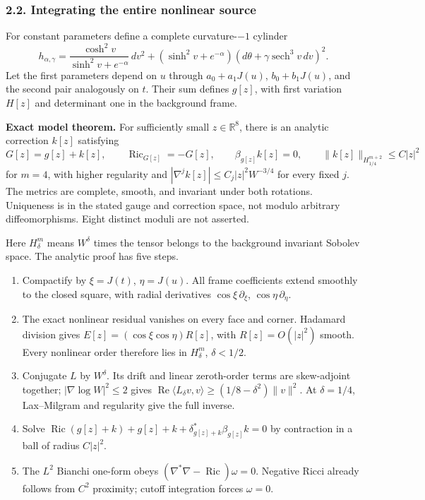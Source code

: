 \documentclass[
  english,
]{article}
\providecommand{\tightlist}{%
  \setlength{\itemsep}{0pt}\setlength{\parskip}{0pt}}
\begin{document}
\hypertarget{integrating-the-entire-nonlinear-source}{%
\subsubsection{2.2. Integrating the entire nonlinear
source}\label{integrating-the-entire-nonlinear-source}}

For constant parameters define a complete curvature-\(-1\) cylinder \[
h_{\alpha,\gamma}
=\frac{\cosh^2v}{\sinh^2v+e^{-\alpha}}\,dv^2
+(\sinh^2v+e^{-\alpha})(d\theta+\gamma\operatorname{sech}^3v\,dv)^2.
\] Let the first parameters depend on \(u\) through \(a_0+a_1J(u)\),
\(b_0+b_1J(u)\), and the second pair analogously on \(t\). Their sum
defines \(g[z]\), with first variation \(H[z]\) and determinant one in
the background frame.

\textbf{Exact model theorem.} For sufficiently small
\(z\in\mathbb R^8\), there is an analytic correction \(k[z]\) satisfying
\[
G[z]=g[z]+k[z],\qquad \operatorname{Ric}_{G[z]}=-G[z],\qquad
\beta_{g[z]}k[z]=0,\qquad
\|k[z]\|_{H^{m+2}_{1/4}}\le C|z|^2
\tag{2.3}
\] for \(m=4\), with higher regularity and
\(|\nabla^jk[z]|\le C_j|z|^2W^{-3/4}\) for every fixed \(j\). The
metrics are complete, smooth, and invariant under both rotations.
Uniqueness is in the stated gauge and correction space, not modulo
arbitrary diffeomorphisms. Eight distinct moduli are not asserted.

Here \(H^m_\delta\) means \(W^\delta\) times the tensor belongs to the
background invariant Sobolev space. The analytic proof has five steps.

\begin{enumerate}
\def\labelenumi{\arabic{enumi}.}
\tightlist
\item
  Compactify by \(\xi=J(t)\), \(\eta=J(u)\). All frame coefficients
  extend smoothly to the closed square, with radial derivatives
  \(\cos\xi\,\partial_\xi\), \(\cos\eta\,\partial_\eta\).
\item
  The exact nonlinear residual vanishes on every face and corner.
  Hadamard division gives \(E[z]=(\cos\xi\cos\eta)R[z]\), with
  \(R[z]=O(|z|^2)\) smooth. Every nonlinear order therefore lies in
  \(H^m_\delta\), \(\delta<1/2\).
\item
  Conjugate \(L\) by \(W^\delta\). Its drift and linear zeroth-order
  terms are skew-adjoint together; \(|\nabla\log W|^2\le2\) gives
  \(\operatorname{Re}\langle L_\delta v,v\rangle \ge(1/8-\delta^2)\|v\|^2\).
  At \(\delta=1/4\), Lax--Milgram and regularity give the full inverse.
\item
  Solve
  \(\operatorname{Ric}(g[z]+k)+g[z]+k+ \delta^*_{g[z]+k}\beta_{g[z]}k=0\)
  by contraction in a ball of radius \(C|z|^2\).
\item
  The \(L^2\) Bianchi one-form obeys
  \((\nabla^*\nabla-\operatorname{Ric})\omega=0\). Negative Ricci
  already follows from \(C^2\) proximity; cutoff integration forces
  \(\omega=0\).
\end{enumerate}
\end{document}

